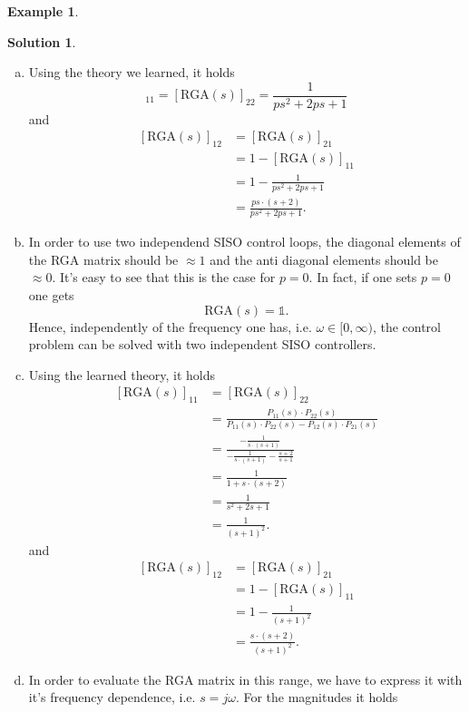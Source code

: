 \documentclass[a4paper,12 pt]{article}
\numberwithin{equation}{section}
\theoremstyle{definition}
\newtheorem{bsp}{Example}
\theoremstyle{remark}
\theoremstyle{definition}
\newtheorem*{lsg}{Solution}
\theoremstyle{definition}
\theoremstyle{definition}
\theoremstyle{remark}
\begin{document}
\begin{bsp}
\newpage
\begin{lsg}
\
\begin{enumerate}[(a)]
\item Using the theory we learned, it holds
\begin{equation*}
[\text{RGA}(s)]_{11}=[\text{RGA}(s)]_{22}=\frac{1}{ps^2+2ps+1}
\end{equation*}
and
\begin{equation*}
\begin{split}
[\text{RGA}(s)]_{12}&=[\text{RGA}(s)]_{21}\\
&=1-[\text{RGA}(s)]_{11}\\
&=1-\frac{1}{ps^2+2ps+1}\\
&=\frac{ps\cdot (s+2)}{ps^2+2ps+1}.
\end{split}
\end{equation*}
\item In order to use two independend SISO control loops, the diagonal elements of the RGA matrix should be $\approx 1$ and the anti diagonal elements should be $\approx 0$. It's easy to see that this is the case for $p=0$. In fact, if one sets $p=0$ one gets
$$\text{RGA}(s)=\mathbb{1}.$$
Hence, independently of the frequency one has, i.e. $\omega \in [0,\infty)$, the control problem can be solved with two independent SISO controllers.
\item Using the learned theory, it holds
\begin{equation*}
\begin{split}
[\text{RGA}(s)]_{11}&=[\text{RGA}(s)]_{22}\\
&=\frac{P_{11}(s)\cdot P_{22}(s)}{P_{11}(s)\cdot P_{22}(s)-P_{12}(s)\cdot P_{21}(s)}\\
&=\frac{-\frac{1}{s\cdot(s+1)}}{-\frac{1}{s\cdot(s+1)}-\frac{s+2}{s+1}}\\
&=\frac{1}{1+s\cdot (s+2)}\\
&=\frac{1}{s^2+2s+1}\\
&=\frac{1}{(s+1)^2}.
\end{split}
\end{equation*}
and
\begin{equation*}
\begin{split}
[\text{RGA}(s)]_{12}&=[\text{RGA}(s)]_{21}\\
&=1-[\text{RGA}(s)]_{11}\\
&=1-\frac{1}{(s+1)^2}\\
&= \frac{s\cdot (s+2)}{(s+1)^2}.
\end{split}
\end{equation*}
\item In order to evaluate the RGA matrix in this range, we have to express it with it's frequency dependence, i.e. $s=j\omega$. For the magnitudes it holds

\end{enumerate}
\end{lsg}
\end{bsp}
\end{document}
